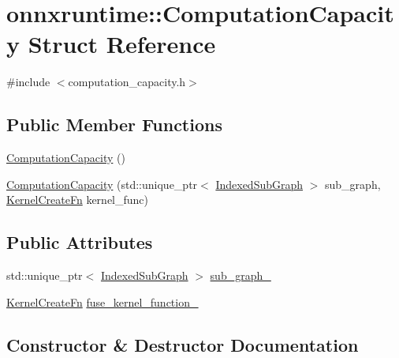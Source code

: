 \hypertarget{structonnxruntime_1_1ComputationCapacity}{}\section{onnxruntime\+:\+:Computation\+Capacity Struct Reference}
\label{structonnxruntime_1_1ComputationCapacity}


{\ttfamily \#include $<$computation\+\_\+capacity.\+h$>$}

\subsection*{Public Member Functions}
\begin{DoxyCompactItemize}
\item 
\mbox{\hyperlink{structonnxruntime_1_1ComputationCapacity_a5624fe494c019d25075d9970c63c97bf}{Computation\+Capacity}} ()
\item 
\mbox{\hyperlink{structonnxruntime_1_1ComputationCapacity_aa348a72c4a20003005cbadb52a5e3972}{Computation\+Capacity}} (std\+::unique\+\_\+ptr$<$ \mbox{\hyperlink{structonnxruntime_1_1IndexedSubGraph}{Indexed\+Sub\+Graph}} $>$ sub\+\_\+graph, \mbox{\hyperlink{namespaceonnxruntime_a2e23731e78afbe4e5e15a18493162335}{Kernel\+Create\+Fn}} kernel\+\_\+func)
\end{DoxyCompactItemize}
\subsection*{Public Attributes}
\begin{DoxyCompactItemize}
\item 
std\+::unique\+\_\+ptr$<$ \mbox{\hyperlink{structonnxruntime_1_1IndexedSubGraph}{Indexed\+Sub\+Graph}} $>$ \mbox{\hyperlink{structonnxruntime_1_1ComputationCapacity_ad036d087d74f02901257c77b9fb72652}{sub\+\_\+graph\+\_\+}}
\item 
\mbox{\hyperlink{namespaceonnxruntime_a2e23731e78afbe4e5e15a18493162335}{Kernel\+Create\+Fn}} \mbox{\hyperlink{structonnxruntime_1_1ComputationCapacity_ab433b9802a03d8daf8ba236d22e13a4e}{fuse\+\_\+kernel\+\_\+function\+\_\+}}
\end{DoxyCompactItemize}


\subsection{Constructor \& Destructor Documentation}
\mbox{\label{structonnxruntime_1_1ComputationCapacity_a5624fe494c019d25075d9970c63c97bf}} 

